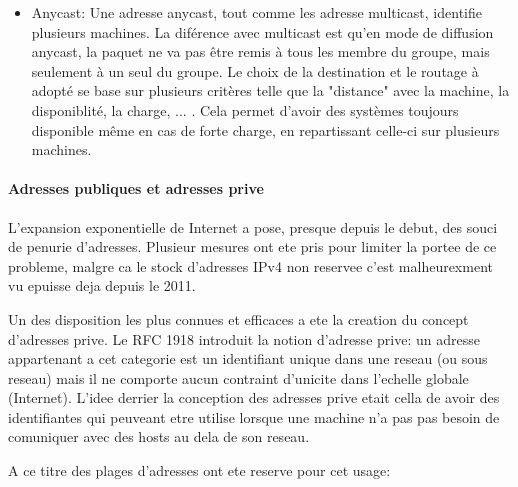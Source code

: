 \begin{itemize}
plusieurs machines simplement, une adresse peut être utilisé depuis cette plage.
Elle s'étend de l'adresse 224.0.0.0 à l'adresse 239.255.255.255 et à pour masque 240.0.0.0 . Cela laisse donc 2\^28 adresses
multicast différente.
Au sein de cette plage d'adresse il existe une catégorisation:
//TODO
\begin{itemize}
\item
\end{itemize}
Ce mode permet de limiter le nombre de paquet envoyé pour joindre plusieurs machine et il est très utilisé dans le cas
de diffusion en streaming ou de videoconférence, où il faut faire pervenir une même information à plusieurs autres
participants.
\item Anycast: Une adresse anycast, tout comme les adresse multicast, identifie plusieurs machines. La diférence avec multicast
est qu'en mode de diffusion anycast, la paquet ne va pas être remis à tous les membre du groupe, mais seulement à un seul du groupe.
Le choix de la destination et le routage à adopté se base sur plusieurs critères telle que la "distance" avec la machine, la disponiblité,
la charge, ... . Cela permet d'avoir des systèmes toujours disponible même en cas de forte charge, en repartissant celle-ci sur
plusieurs machines.
\end{itemize}



\paragraph{Adresses publiques et adresses prive}
L'expansion exponentielle de Internet a pose, presque depuis le debut, des
souci de penurie d'adresses. Plusieur mesures ont ete pris pour limiter la
portee de ce probleme, malgre ca le stock d'adresses IPv4 non reservee
c'est malheurexment vu epuisse deja depuis le 2011.

Un des disposition les plus connues et efficaces a ete la creation du concept
d'adresses prive. Le RFC 1918 introduit la notion d'adresse prive: un adresse
appartenant a cet categorie est un identifiant unique dans une reseau (ou sous
reseau) mais il ne comporte aucun contraint d'unicite dans l'echelle globale
(Internet). L'idee derrier la conception des adresses prive etait cella de
avoir des identifiantes qui peuveant etre utilise lorsque une machine n'a pas
pas besoin de comuniquer avec des hosts au dela de son reseau.

A ce titre des plages d'adresses ont ete reserve pour cet usage:


